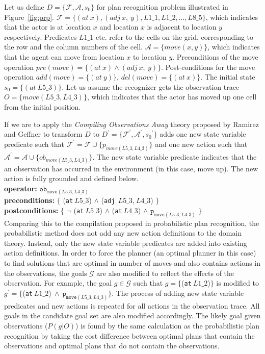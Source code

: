 Let us define $D = \lbrace \mathcal{F}, \mathcal{A}, s_0 \rbrace$ for plan recognition problem illustrated in Figure~\ref{fig:prp}. $\mathcal{F}= \lbrace (at\:x), (adj\:x,\:y), L1\_1, L1\_2, \ldots, L8\_5\rbrace$, which indicates that the actor is at location $x$ and location $x$ is adjacent to location $y$ respectively. Predicates $L1\_1$ etc. refer to the cells on the grid, corresponding to the row and the column numbers of the cell. $\mathcal{A}= \lbrace move(x,y)\rbrace$, which indicates that the agent can move from location $x$ to location $y$. Preconditions of the move operation $pre(move)=\lbrace (at\:x)  \land  (adj\:x,\:y) \rbrace$. Post-conditions for the move operation $add(move)=\lbrace (at\:y) \rbrace$, $del(move)=\lbrace (at\:x) \rbrace$. The initial state $s_0=\lbrace (at\:L5\_3)\rbrace$. Let us assume the recognizer gets the observation trace $O=\lbrace move(L5\_3, L4\_3)\rbrace$, which indicates that the actor has moved up one cell from the initial position.

If we are to apply the \textit{Compiling Observations Away} theory proposed by Ramirez and Geffner to transform $D$ to $D^\prime=\lbrace \mathcal{F}^\prime, \mathcal{A}^\prime, {s_0}^\prime\rbrace$ adds one new state variable predicate such that $\mathcal{F}^\prime=\mathcal{F}\cup\lbrace p_{move(L5\_3, L4\_3)}\rbrace$ and one new action such that $\mathcal{A}^\prime=\mathcal{A}\cup\lbrace ob_{move(L5\_3, L4\_3)}\rbrace$. The new state variable predicate indicates that the an observation has occurred in the environment (in this case, move up). The new action is fully grounded and defined below.\\
\textbf{operator:} $\texttt{ob}_{\texttt{move}(L5\_3, L4\_3)}$\\
\textbf{preconditions:} $\lbrace$ (\texttt{at}$\:L5\_3$) $\land$  (\texttt{adj}$\:\:L5\_3$,$\:L4\_3$) $\rbrace$ \\
\textbf{postconditions:} $\lbrace$ $\neg$ (\texttt{at}$\:L5\_3$) $\land $ (\texttt{at}$\:L4\_3$) $\land$ $\texttt{p}_{\texttt{move}(L5\_3, L4\_3)}$ $\rbrace$\\
Comparing this to the compilation proposed in probabilistic plan recognition, the probabilistic method does not add any new action definitions to the domain theory. Instead, only the new state variable predicates are added into existing action definitions. In order to force the planner (an optimal planner in this case) to find solutions that are optimal in number of moves and also contains actions in the observations, the goals $\mathcal{G}$ are also modified to reflect the effects of the observation. For example, the goal $g \in \mathcal{G}$ such that $g=\lbrace$(\texttt{at}$\:L1\_2$)$\rbrace$ is modified to  $g^\prime=\lbrace$(\texttt{at}$\:L1\_2$)$ \:\land\: \texttt{p}_{\texttt{move}(L5\_3, L4\_3)}\rbrace$. The process of adding new state variable predicates and new actions is repeated for all actions in the observation trace. All goals in the candidate goal set are also modified accordingly. The likely goal given observations ($P(g|O)$) is found by the same calculation as the probabilistic plan recognition by taking the cost difference between optimal plans that contain the observations and optimal plans that do not contain the observations.


